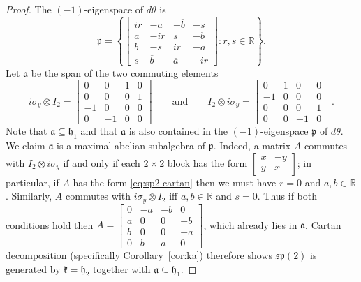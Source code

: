 \documentclass[10pt,a4paper]{amsart}
\newcommand{\RR}{\mathbb{R}}
\renewcommand{\a}{\mathfrak{a}}
\newcommand{\h}{\mathfrak{h}}
\renewcommand{\k}{\mathfrak{k}}
\newcommand{\p}{\mathfrak{p}}
\renewcommand{\sp}{\mathfrak{sp}}
\begin{document}
\begin{proof}
The $(-1)$-eigenspace of $d\theta$ is
\begin{equation} \label{eq:sp2-cartan}
\p = \left\{ \left[ \begin{smallmatrix}
ir & -\overline{a} & -\overline{b} & -s\\
a &  -ir 		  & s   & -b\\
b & -s  & ir & -a\\
s & \overline{b}   & \overline{a}  & -ir
\end{smallmatrix}\right] : r,s \in \RR \right\}.
\end{equation}
Let $\a$ be the span of the two commuting elements
\begin{equation*}
i\sigma_y \otimes I_2 = \left[ \begin{smallmatrix}
0 & 0 & 1 & 0\\
0 & 0 & 0 & 1\\
-1 &0 & 0 & 0\\
0 & -1 & 0 & 0
\end{smallmatrix} \right] \qquad \text{and} \qquad I_2 \otimes i\sigma_y = \left[ \begin{smallmatrix}
0 & 1 & 0 & 0\\
-1 & 0 & 0 & 0\\
0 & 0 & 0 & 1\\
0 & 0 & -1 & 0
\end{smallmatrix} \right].
\end{equation*}
Note that $\a \subseteq \h_1$ and that $\a$ is also contained in the $(-1)$-eigenspace $\p$ of $d\theta$. We claim $\a$ is a maximal abelian subalgebra of $\p$. Indeed, a matrix $A$ commutes with $I_2 \otimes i\sigma_y$ if and only if each $2 \times 2$ block has the form $\left[ \begin{smallmatrix} x & -y \\ y & x \end{smallmatrix} \right]$; in particular, if $A$ has the form \eqref{eq:sp2-cartan} then we must have $r = 0$ and $a,b \in \RR$. Similarly, $A$ commutes with $i\sigma_y \otimes I_2$ iff $a,b \in \RR$ and $s = 0$. Thus if both conditions hold then $A =  \left[ \begin{smallmatrix}
0 & -a & -b & 0\\
a &  0 		  & 0   & -b\\
b & 0  & 0 & -a\\
0 & b   & a  & 0
\end{smallmatrix}\right]$, which already lies in $\a$. Cartan decomposition (specifically Corollary~\ref{cor:ka}) therefore shows $\sp(2)$ is generated by $\k = \h_2$ together with $\a \subseteq \h_1$.
\end{proof}
\end{document}
